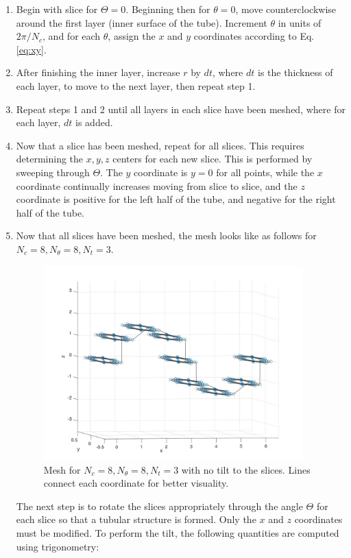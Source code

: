 \documentclass[10pt]{article}
\begin{document}
\begin{enumerate}
\item Begin with slice for \(\Theta=0\). Beginning then for \(\theta=0\), move counterclockwise around the first layer (inner surface of the tube). Increment \(\theta\) in units of \(2\pi/N_c\), and for each \(\theta\), assign the \(x\) and \(y\) coordinates according to Eq. \eqref{eq:xy}. 
\item After finishing the inner layer, increase \(r\) by \(dt\), where \(dt\) is the thickness of each layer, to move to the next layer, then repeat step 1. 
\item Repeat steps 1 and 2 until all layers in each slice have been meshed, where for each layer, \(dt\) is added. 
\item Now that a slice has been meshed, repeat for all slices. This requires determining the \(x,y,z\) centers for each new slice. This is performed by sweeping through \(\Theta\). The \(y\) coordinate is \(y=0\) for all points, while the \(x\) coordinate continually increases moving from slice to slice, and the \(z\) coordinate is positive for the left half of the tube, and negative for the right half of the tube. 
\item Now that all slices have been meshed, the mesh looks like as follows for \(N_c=8, N_\theta=8, N_t=3\). 

\begin{figure}[H]
  \centering
  \includegraphics[width=10cm]{NoTilt.jpg}
  \caption{Mesh for \(N_c=8, N_\theta=8, N_t=3\) with no tilt to the slices. Lines connect each coordinate for better visuality.}
\end{figure}

The next step is to rotate the slices appropriately through the angle \(\Theta\) for each slice so that a tubular structure is formed. Only the \(x\) and \(z\) coordinates must be modified. To perform the tilt, the following quantities are computed using trigonometry:


\end{enumerate}
\end{document}
